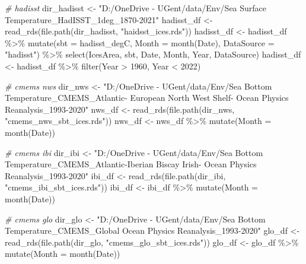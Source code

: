 \documentclass[
]{article}
\newenvironment{Shaded}{\begin{snugshade}}{\end{snugshade}}
\newcommand{\AttributeTok}[1]{\textcolor[rgb]{0.77,0.63,0.00}{#1}}
\newcommand{\CommentTok}[1]{\textcolor[rgb]{0.56,0.35,0.01}{\textit{#1}}}
\newcommand{\DecValTok}[1]{\textcolor[rgb]{0.00,0.00,0.81}{#1}}
\newcommand{\FunctionTok}[1]{\textcolor[rgb]{0.00,0.00,0.00}{#1}}
\newcommand{\NormalTok}[1]{#1}
\newcommand{\OtherTok}[1]{\textcolor[rgb]{0.56,0.35,0.01}{#1}}
\newcommand{\SpecialCharTok}[1]{\textcolor[rgb]{0.00,0.00,0.00}{#1}}
\newcommand{\StringTok}[1]{\textcolor[rgb]{0.31,0.60,0.02}{#1}}
\begin{document}
\begin{Shaded}
\begin{Highlighting}[]
\CommentTok{\# hadisst}
\NormalTok{dir\_hadisst }\OtherTok{\textless{}{-}} \StringTok{"D:/OneDrive {-} UGent/data/Env/Sea Surface Temperature\_HadISST\_1deg\_1870{-}2021"}
\NormalTok{hadisst\_df }\OtherTok{\textless{}{-}} \FunctionTok{read\_rds}\NormalTok{(}\FunctionTok{file.path}\NormalTok{(dir\_hadisst, }\StringTok{"haidsst\_ices.rds"}\NormalTok{))}
\NormalTok{hadisst\_df }\OtherTok{\textless{}{-}}\NormalTok{ hadisst\_df }\SpecialCharTok{\%\textgreater{}\%} \FunctionTok{mutate}\NormalTok{(}\AttributeTok{sbt =}\NormalTok{ hadisst\_degC,}
                                    \AttributeTok{Month =} \FunctionTok{month}\NormalTok{(Date),}
                                    \AttributeTok{DataSource =} \StringTok{"hadisst"}\NormalTok{)  }\SpecialCharTok{\%\textgreater{}\%}
  \FunctionTok{select}\NormalTok{(IcesArea, sbt, Date, Month, Year, DataSource)}
\NormalTok{hadisst\_df }\OtherTok{\textless{}{-}}\NormalTok{ hadisst\_df }\SpecialCharTok{\%\textgreater{}\%} \FunctionTok{filter}\NormalTok{(Year }\SpecialCharTok{\textgreater{}} \DecValTok{1960}\NormalTok{, Year }\SpecialCharTok{\textless{}} \DecValTok{2022}\NormalTok{)}

\CommentTok{\# cmems nws}
\NormalTok{dir\_nws }\OtherTok{\textless{}{-}} \StringTok{"D:/OneDrive {-} UGent/data/Env/Sea Bottom Temperature\_CMEMS\_Atlantic{-} European North West Shelf{-} Ocean Physics Reanalysis\_1993{-}2020"}
\NormalTok{nws\_df }\OtherTok{\textless{}{-}} \FunctionTok{read\_rds}\NormalTok{(}\FunctionTok{file.path}\NormalTok{(dir\_nws, }\StringTok{"cmems\_nws\_sbt\_ices.rds"}\NormalTok{))}
\NormalTok{nws\_df }\OtherTok{\textless{}{-}}\NormalTok{ nws\_df }\SpecialCharTok{\%\textgreater{}\%} \FunctionTok{mutate}\NormalTok{(}\AttributeTok{Month =} \FunctionTok{month}\NormalTok{(Date))}

\CommentTok{\# cmems ibi}
\NormalTok{dir\_ibi }\OtherTok{\textless{}{-}} \StringTok{"D:/OneDrive {-} UGent/data/Env/Sea Bottom Temperature\_CMEMS\_Atlantic{-}Iberian Biscay Irish{-} Ocean Physics Reanalysis\_1993{-}2020"}
\NormalTok{ibi\_df }\OtherTok{\textless{}{-}} \FunctionTok{read\_rds}\NormalTok{(}\FunctionTok{file.path}\NormalTok{(dir\_ibi, }\StringTok{"cmems\_ibi\_sbt\_ices.rds"}\NormalTok{))}
\NormalTok{ibi\_df }\OtherTok{\textless{}{-}}\NormalTok{ ibi\_df }\SpecialCharTok{\%\textgreater{}\%} \FunctionTok{mutate}\NormalTok{(}\AttributeTok{Month =} \FunctionTok{month}\NormalTok{(Date))}

\CommentTok{\# cmems glo }
\NormalTok{dir\_glo }\OtherTok{\textless{}{-}} \StringTok{"D:/OneDrive {-} UGent/data/Env/Sea Bottom Temperature\_CMEMS\_Global Ocean Physics Reanalysis\_1993{-}2020"}
\NormalTok{glo\_df }\OtherTok{\textless{}{-}} \FunctionTok{read\_rds}\NormalTok{(}\FunctionTok{file.path}\NormalTok{(dir\_glo, }\StringTok{"cmems\_glo\_sbt\_ices.rds"}\NormalTok{))}
\NormalTok{glo\_df }\OtherTok{\textless{}{-}}\NormalTok{ glo\_df }\SpecialCharTok{\%\textgreater{}\%} \FunctionTok{mutate}\NormalTok{(}\AttributeTok{Month =} \FunctionTok{month}\NormalTok{(Date))}


\end{Highlighting}
\end{Shaded}
\end{document}
